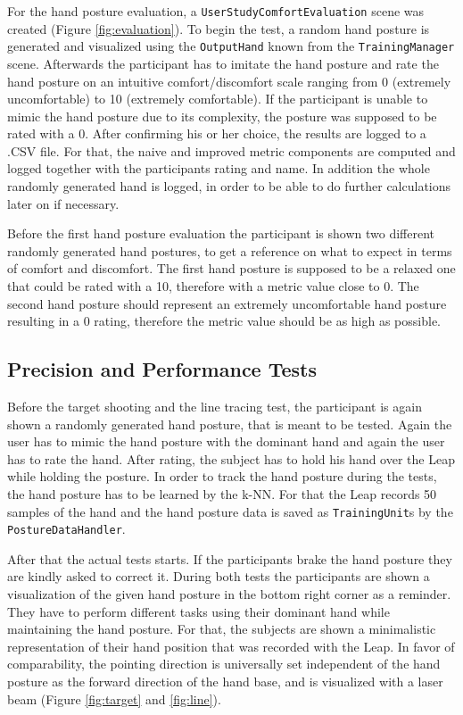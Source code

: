 For the hand posture evaluation, a \texttt{UserStudyComfortEvaluation} scene was created (Figure \ref{fig:evaluation}). To begin the test, a random hand posture is generated and visualized using the \texttt{OutputHand} known from the \texttt{TrainingManager} scene. Afterwards the participant has to imitate the hand posture and rate the hand posture on an intuitive comfort/discomfort scale ranging from 0 (extremely uncomfortable) to 10 (extremely comfortable). If the participant is unable to mimic the hand posture due to its complexity, the posture was supposed to be rated with a 0. After confirming his or her choice, the results are logged to a .CSV file. For that, the naive and improved metric components are computed and logged together with the participants rating and name. In addition the whole randomly generated hand is logged, in order to be able to do further calculations later on if necessary.

Before the first hand posture evaluation the participant is shown two different randomly generated hand postures, to get a reference on what to expect in terms of comfort and discomfort. The first hand posture is supposed to be a relaxed one that could be rated with a 10, therefore with a metric value close to 0. The second hand posture should represent an extremely uncomfortable hand posture resulting in a 0 rating, therefore the metric value should be as high as possible.

\subsection{Precision and Performance Tests}

Before the target shooting and the line tracing test, the participant is again shown a randomly generated hand posture, that is meant to be tested. Again the user has to mimic the hand posture with the dominant hand and again the user has to rate the hand. After rating, the subject has to hold his hand over the Leap while holding the posture. In order to track the hand posture during the tests, the hand posture has to be learned by the k-NN. For that the Leap records 50 samples of the hand and the hand posture data is saved as \texttt{TrainingUnit}s by the \texttt{PostureDataHandler}. 

After that the actual tests starts. If the participants brake the hand posture they are kindly asked to correct it. During both tests the participants are shown a visualization of the given hand posture in the bottom right corner as a reminder. They have to perform different tasks using their dominant hand while maintaining the hand posture. 
For that, the subjects are shown a minimalistic representation of their hand position that was recorded with the Leap. In favor of comparability, the pointing direction is universally set independent of the hand posture as the forward direction of the hand base, and is visualized with a laser beam (Figure \ref{fig:target} and \ref{fig:line}). 

